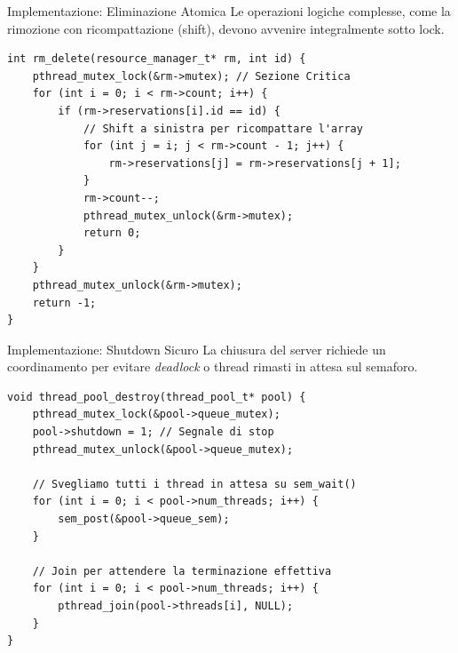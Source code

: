 \documentclass[aspectratio=169, 10pt]{beamer}
\begin{document}
\begin{frame}[fragile]{Implementazione: Eliminazione Atomica}
    Le operazioni logiche complesse, come la rimozione con ricompattazione (shift), devono avvenire integralmente sotto lock.
    
\begin{lstlisting}[style=cstyle]
int rm_delete(resource_manager_t* rm, int id) {
    pthread_mutex_lock(&rm->mutex); // Sezione Critica
    for (int i = 0; i < rm->count; i++) {
        if (rm->reservations[i].id == id) {
            // Shift a sinistra per ricompattare l'array
            for (int j = i; j < rm->count - 1; j++) {
                rm->reservations[j] = rm->reservations[j + 1];
            }
            rm->count--;
            pthread_mutex_unlock(&rm->mutex);
            return 0;
        }
    }
    pthread_mutex_unlock(&rm->mutex);
    return -1;
}
\end{lstlisting}
\end{frame}

\begin{frame}[fragile]{Implementazione: Shutdown Sicuro}
    La chiusura del server richiede un coordinamento per evitare \textit{deadlock} o thread rimasti in attesa sul semaforo.
    
\begin{lstlisting}[style=cstyle]
void thread_pool_destroy(thread_pool_t* pool) {
    pthread_mutex_lock(&pool->queue_mutex);
    pool->shutdown = 1; // Segnale di stop
    pthread_mutex_unlock(&pool->queue_mutex);

    // Svegliamo tutti i thread in attesa su sem_wait()
    for (int i = 0; i < pool->num_threads; i++) {
        sem_post(&pool->queue_sem);
    }

    // Join per attendere la terminazione effettiva
    for (int i = 0; i < pool->num_threads; i++) {
        pthread_join(pool->threads[i], NULL);
    }
}
\end{lstlisting}
\end{frame}
\end{document}
